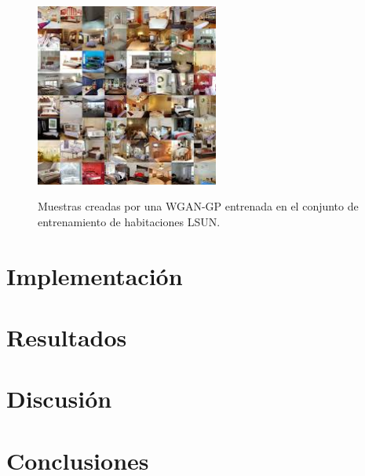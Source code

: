\documentclass[spanish,a4paper, 11pt]{article}
\numberwithin{equation}{section}
\numberwithin{table}{section}
\numberwithin{figure}{section}
\begin{document}
\begin{figure}[H]
	\centering
	\includegraphics[width=6cm]{lsun.jpg}
	\label{fig:lsun_bedroom}
	\caption{Muestras creadas por una WGAN-GP entrenada en el conjunto de entrenamiento de habitaciones LSUN.}
\end{figure}	
\newpage
	
\section{Implementación}
\label{Implementacion}

\newpage

	
\section{Resultados}
\label{Resultados}	

	
\newpage
\section{Discusión}
\label{Discusion}
	
	
\section{Conclusiones}
	
\newpage
	
\end{document}
